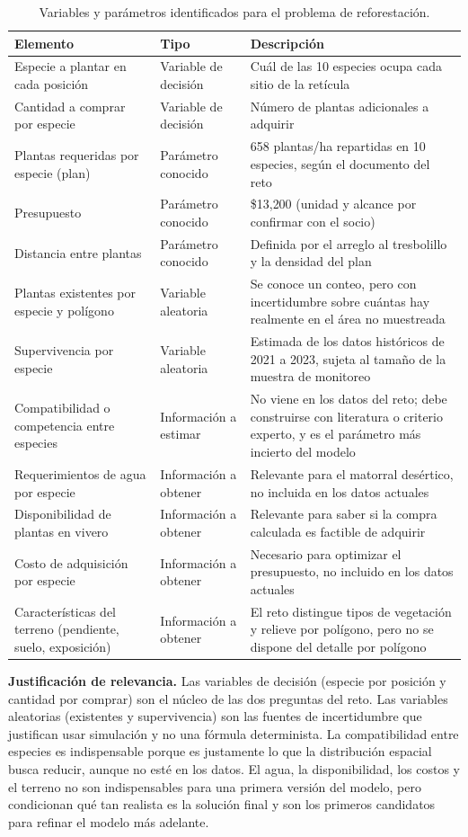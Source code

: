 \begin{table}[t]
\centering
\caption{Variables y parámetros identificados para el problema de reforestación.}
\label{tab:variables-parametros}
\small
\begin{tabular}{@{}p{}p{}p{}@{}}
\toprule
Elemento & Tipo & Descripción \\
\midrule
Especie a plantar en cada posición & Variable de decisión & Cuál de las 10 especies ocupa cada sitio de la retícula \\
Cantidad a comprar por especie & Variable de decisión & Número de plantas adicionales a adquirir \\
Plantas requeridas por especie (plan) & Parámetro conocido & 658 plantas/ha repartidas en 10 especies, según el documento del reto \\
Presupuesto & Parámetro conocido & \$13{,}200 (unidad y alcance por confirmar con el socio) \\
Distancia entre plantas & Parámetro conocido & Definida por el arreglo al tresbolillo y la densidad del plan \\
Plantas existentes por especie y polígono & Variable aleatoria & Se conoce un conteo, pero con incertidumbre sobre cuántas hay realmente en el área no muestreada \\
Supervivencia por especie & Variable aleatoria & Estimada de los datos históricos de 2021 a 2023, sujeta al tamaño de la muestra de monitoreo \\
Compatibilidad o competencia entre especies & Información a estimar & No viene en los datos del reto; debe construirse con literatura o criterio experto, y es el parámetro más incierto del modelo \\
Requerimientos de agua por especie & Información a obtener & Relevante para el matorral desértico, no incluida en los datos actuales \\
Disponibilidad de plantas en vivero & Información a obtener & Relevante para saber si la compra calculada es factible de adquirir \\
Costo de adquisición por especie & Información a obtener & Necesario para optimizar el presupuesto, no incluido en los datos actuales \\
Características del terreno (pendiente, suelo, exposición) & Información a obtener & El reto distingue tipos de vegetación y relieve por polígono, pero no se dispone del detalle por polígono \\
\bottomrule
\end{tabular}
\end{table}

\textbf{Justificación de relevancia.} Las variables de decisión (especie por posición y cantidad por comprar) son el núcleo de las dos preguntas del reto. Las variables aleatorias (existentes y supervivencia) son las fuentes de incertidumbre que justifican usar simulación y no una fórmula determinista. La compatibilidad entre especies es indispensable porque es justamente lo que la distribución espacial busca reducir, aunque no esté en los datos. El agua, la disponibilidad, los costos y el terreno no son indispensables para una primera versión del modelo, pero condicionan qué tan realista es la solución final y son los primeros candidatos para refinar el modelo más adelante.
